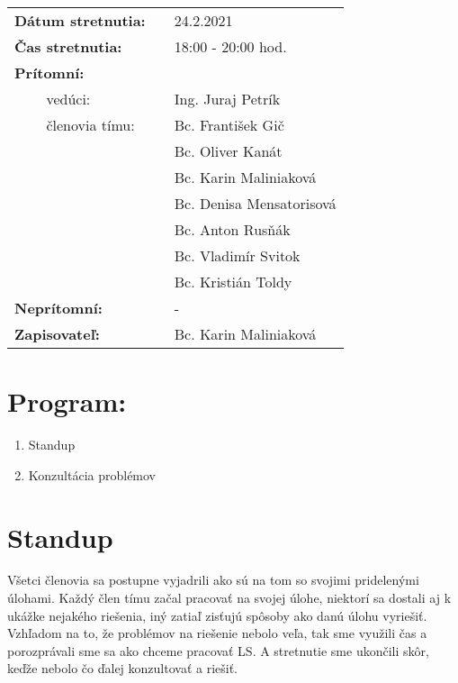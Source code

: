 \documentclass{article}
\begin{document}
    

    \begin{table}[h]
        \begin{tabular}{lllll}
            \multicolumn{3}{l}{\textbf{Dátum stretnutia:}} & & 24.2.2021 \\
            \multicolumn{3}{l}{\textbf{Čas stretnutia:}} & & 18:00 - 20:00 hod. \\
            \multicolumn{3}{l}{\textbf{Prítomní:}} \\
            & & vedúci: & & Ing. Juraj Petrík \\
            & & členovia tímu: & & Bc. František Gič  \\
            & & & & Bc. Oliver Kanát \\
            & & & & Bc. Karin Maliniaková \\
            & & & & Bc. Denisa Mensatorisová \\
            & & & & Bc. Anton Rusňák \\
            & & & & Bc. Vladimír Svitok \\
            & & & & Bc. Kristián Toldy \\
            \multicolumn{3}{l}{\textbf{Neprítomní:}} & & -\\
            \multicolumn{3}{l}{\textbf{Zapisovateľ:}} & & Bc. Karin Maliniaková \\
        \end{tabular}
        \label{tab:grades}
    \end{table}

    \section*{Program:}

    \begin{enumerate}
        \item Standup
        \item Konzultácia problémov
    \end{enumerate}

    \section*{Standup}

        \textnormal {Všetci členovia sa postupne vyjadrili ako sú na tom so svojimi pridelenými úlohami. Každý člen tímu začal pracovať na svojej úlohe, niektorí sa dostali aj k ukážke nejakého riešenia, iný zatiaľ zisťujú spôsoby ako danú úlohu vyriešiť.}
        \textnormal {Vzhľadom na to, že problémov na riešenie nebolo veľa, tak sme využili čas a porozprávali sme sa ako chceme pracovať LS. A stretnutie sme ukončili skôr, keďže nebolo čo ďalej konzultovať a riešiť. }
\end{document}
